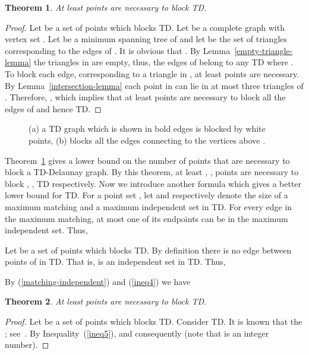 \documentclass[11pt,a4paper]{article}
\newcommand{\kTD}[2]{\text{-}TD#2}
\newtheorem{theorem}{Theorem}
\begin{document}
\begin{theorem}
\label{blocking-thr1}
  At least  points are necessary to block \kTD{k}{}.
\end{theorem}
\begin{proof}
Let  be a set of  points which blocks \kTD{k}{}. Let  be a complete graph with vertex set . Let  be a minimum spanning tree of  and let  be the set of triangles corresponding to the edges of . It is obvious that . By Lemma~\ref{empty-triangle-lemma} the triangles in  are empty, thus, the edges of  belong to any \kTD{k}{} where . To block each edge, corresponding to a triangle in , at least  points are necessary. By Lemma~\ref{intersection-lemma} each point in  can lie in at most three triangles of . Therefore, , which implies that at least  points are necessary to block all the edges of  and hence \kTD{k}{}.
\end{proof}
\begin{figure}[htb]
  \centering
\setlength{\tabcolsep}{0in}
  
  \caption{(a) a \kTD{0}{} graph which is shown in bold edges is blocked by  white points, (b)  blocks all the edges connecting  to the vertices above .}
\label{blocking-fig}
\end{figure}

Theorem~\ref{blocking-thr1} gives a lower bound on the number of points that are necessary to block a TD-Delaunay graph. By this theorem, at least , ,  points are necessary to block , , \kTD{2}{} respectively. Now we introduce another formula which gives a better lower bound for \kTD{0}{}. For a point set , let  and  respectively denote the size of a maximum matching and a maximum independent set in \kTD{k}{}. For every edge in the maximum matching, at most one of its endpoints can be in the maximum independent set. Thus,

Let  be a set of  points which blocks \kTD{k}{}. By definition there is no edge between points of  in \kTD{k}{}. That is,  is an independent set in \kTD{k}{}. Thus, 

By (\ref{matching-independent}) and (\ref{ineq4}) we have

\begin{theorem}
\label{blocking-0TD-thr}
  At least  points are necessary to block \kTD{0}{}.
\end{theorem}
\begin{proof}
Let  be a set of  points which blocks \kTD{k}{}. Consider \kTD{0}{}. It is known that the ; see~\cite{Babu2013}. By Inequality~(\ref{ineq5}),  and consequently  (note that  is an integer number).
\end{proof}
\end{document}
